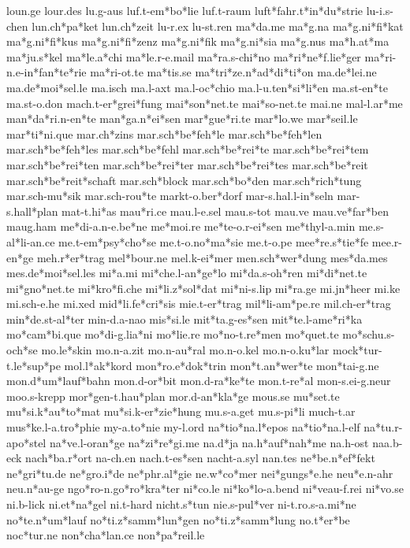 loun.ge
lour.des
lu.g-aus
luf.t-em*bo*lie
luf.t-raum
luft*fahr.t*in*du*strie
lu-i.s-chen
lun.ch*pa*ket
lun.ch*zeit
lu-r.ex
lu-st.ren
ma*da.me
ma*g.na
ma*g.ni*fi*kat
ma*g.ni*fi*kus
ma*g.ni*fi*zenz
ma*g.ni*fik
ma*g.ni*sia
ma*g.nus
ma*h.at*ma
ma*ju.s*kel
ma*le.a*chi
ma*le.r-e.mail
ma*ra.s-chi*no
ma*ri*ne*f.lie*ger
ma*ri-n.e-in*fan*te*rie
ma*ri-ot.te
ma*tis.se
ma*tri*ze.n*ad*di*ti*on
ma.de*lei.ne
ma.de*moi*sel.le
ma.isch
ma.l-axt
ma.l-oc*chio
ma.l-u.ten*si*li*en
ma.st-en*te
ma.st-o.don
mach.t-er*grei*fung
mai*son*net.te
mai*so-net.te
mai.ne
mal-l.ar*me
man*da*ri.n-en*te
man*ga.n*ei*sen
mar*gue*ri.te
mar*lo.we
mar*seil.le
mar*ti*ni.que
mar.ch*zins
mar.sch*be*feh*le
mar.sch*be*feh*len
mar.sch*be*feh*les
mar.sch*be*fehl
mar.sch*be*rei*te
mar.sch*be*rei*tem
mar.sch*be*rei*ten
mar.sch*be*rei*ter
mar.sch*be*rei*tes
mar.sch*be*reit
mar.sch*be*reit*schaft
mar.sch*block
mar.sch*bo*den
mar.sch*rich*tung
mar.sch-mu*sik
mar.sch-rou*te
markt-o.ber*dorf
mar-s.hal.l-in*seln
mar-s.hall*plan
mat-t.hi*as
mau*ri.ce
mau.l-e.sel
mau.s-tot
mau.ve
mau.ve*far*ben
maug.ham
me*di-a.n-e.be*ne
me*moi.re
me*te-o.r-ei*sen
me*thyl-a.min
me.s-al*li-an.ce
me.t-em*psy*cho*se
me.t-o.no*ma*sie
me.t-o.pe
mee*re.s*tie*fe
mee.r-en*ge
meh.r*er*trag
mel*bour.ne
mel.k-ei*mer
men.sch*wer*dung
mes*da.mes
mes.de*moi*sel.les
mi*a.mi
mi*che.l-an*ge*lo
mi*da.s-oh*ren
mi*di*net.te
mi*gno*net.te
mi*kro*fi.che
mi*li.z*sol*dat
mi*ni-s.lip
mi*ra.ge
mi.jn*heer
mi.ke
mi.sch-e.he
mi.xed
mid*li.fe*cri*sis
mie.t-er*trag
mil*li-am*pe.re
mil.ch-er*trag
min*de.st-al*ter
min-d.a-nao
mis*si.le
mit*ta.g-es*sen
mit*te.l-ame*ri*ka
mo*cam*bi.que
mo*di-g.lia*ni
mo*lie.re
mo*no-t.re*men
mo*quet.te
mo*schu.s-och*se
mo.le*skin
mo.n-a.zit
mo.n-au*ral
mo.n-o.kel
mo.n-o.ku*lar
mock*tur-t.le*sup*pe
mol.l*ak*kord
mon*ro.e*dok*trin
mon*t.an*wer*te
mon*tai-g.ne
mon.d*um*lauf*bahn
mon.d-or*bit
mon.d-ra*ke*te
mon.t-re*al
mon-s.ei-g.neur
moo.s-krepp
mor*gen-t.hau*plan
mor.d-an*kla*ge
mous.se
mu*set.te
mu*si.k*au*to*mat
mu*si.k-er*zie*hung
mu.s-a.get
mu.s-pi*li
much-t.ar
mus*ke.l-a.tro*phie
my-a.to*nie
my-l.ord
na*tio*na.l*epos
na*tio*na.l-elf
na*tu.r-apo*stel
na*ve.l-oran*ge
na*zi*re*gi.me
na.d*ja
na.h*auf*nah*me
na.h-ost
naa.b-eck
nach*ba.r*ort
na-ch.en
nach.t-es*sen
nacht-a.syl
nan.tes
ne*be.n*ef*fekt
ne*gri*tu.de
ne*gro.i*de
ne*phr.al*gie
ne.w*co*mer
nei*gungs*e.he
neu*e.n-ahr
neu.n*au-ge
ngo*ro-n.go*ro*kra*ter
ni*co.le
ni*ko*lo-a.bend
ni*veau-f.rei
ni*vo.se
ni.b-lick
ni.et*na*gel
ni.t-hard
nicht.s*tun
nie.s-pul*ver
ni-t.ro.s-a.mi*ne
no*te.n*um*lauf
no*ti.z*samm*lun*gen
no*ti.z*samm*lung
no.t*er*be
noc*tur.ne
non*cha*lan.ce
non*pa*reil.le
